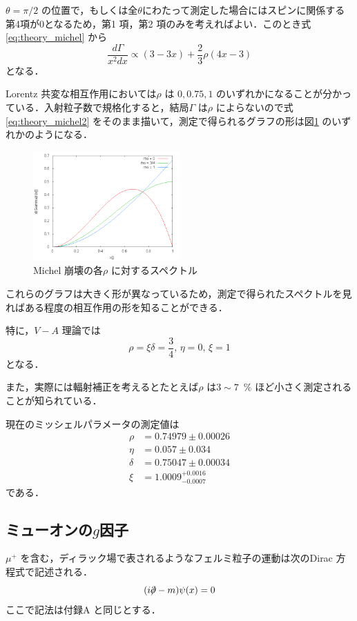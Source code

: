 $\theta = \pi/2$ の位置で，もしくは全$\theta$にわたって測定した場合にはスピンに関係する第4項が0となるため，第1 項，第2 項のみを考えればよい．このとき式\eqref{eq:theory_michel} から
\begin{equation}
\frac{d\Gamma}{x^{2}dx} \propto (3 - 3x) + \frac{2}{3}\rho (4x - 3)
\label{eq:theory_michel2}
\end{equation}
となる．

Lorentz 共変な相互作用においては$\rho$ は $0, 0.75, 1$ のいずれかになることが分かっている\cite{michel_interaction}．入射粒子数で規格化すると，結局$\Gamma$ は$\rho$ によらないので式\eqref{eq:theory_michel2} をそのまま描いて，測定で得られるグラフの形は図\ref{zu:michelpar} のいずれかのようになる．
\begin{figure}[htbp]
\centering
\includegraphics[width = 0.5\textwidth]{figure/abe/michelgraph.png}
\caption{Michel 崩壊の各$\rho$ に対するスペクトル}
\label{zu:michelpar}
\end{figure}
これらのグラフは大きく形が異なっているため，測定で得られたスペクトルを見ればある程度の相互作用の形を知ることができる．

特に，$V-A$ 理論では
\[ \rho = \xi\delta = \frac{3}{4},\, \eta = 0,\, \xi = 1 \]
となる．

また，実際には輻射補正を考えるとたとえば$\rho$ は$3 \sim 7$~\% ほど小さく測定されることが知られている．

現在のミッシェルパラメータの測定値は
\begin{align*}
\rho &= 0.74979 \pm 0.00026\\
\eta &= 0.057 \pm 0.034\\
\delta &= 0.75047 \pm 0.00034\\
\xi &= 1.0009^{+0.0016}_{-0.0007}
\end{align*}
である\cite{PDG}．
	
\subsection{ミューオンの$g$因子}
$\mu^{+}$ を含む，ディラック場で表されるようなフェルミ粒子の運動は次のDirac 方程式で記述される．
\begin{equation}
(i\Slash{\partial} - m)\psi(x) = 0
\label{eq:theory_dirac}
\end{equation}
ここで記法は付録A と同じとする．

